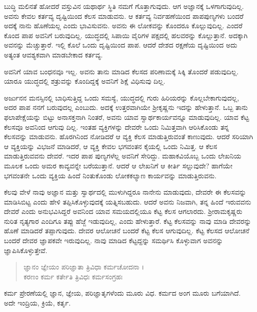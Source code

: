 ಬುದ್ಧಿ ಮಲಿನತೆ ಹೋದರೆ ವಸ್ತುವಿನ ಯಥಾರ್ಥ ಸ್ಥಿತಿ ನಮಗೆ ಗೊತ್ತಾಗುವುದು. ಆಗ ಅಜ್ಞಾನಕ್ಕೆ ಒಳಗಾಗುವುದಿಲ್ಲ. ಅವನು ಕೇವಲ ಕರ್ತವ್ಯ ದೃಷ್ಟಿಯಿಂದ ಕೆಲಸ ಮಾಡುವನು. ಆ ಕರ್ತವ್ಯ ನಿರ್ವಹಣೆಯಿಂದ ಪಾಪಪುಣ್ಯಗಳು ಬಂದರೆ ಅದಕ್ಕೆ ನಾನು ಹೊಣೆಯಲ್ಲ ಎಂದು ಭಾವಿಸುವನು. ಅವನು ಈ ಲೋಕವನ್ನು ಕೊಂದರೂ ಕೊಲ್ಲುವುದಿಲ್ಲ. ಎಂದರೆ ಕೊಂದ ಪಾಪ ಅವನಿಗೆ ಬರುವುದಿಲ್ಲ. ಯುದ್ಧದಲ್ಲಿ ಸಿಪಾಯಿ ವೈರಿಗಳ ಪಕ್ಷದಲ್ಲಿ ಹಲವರನ್ನು ಕೊಲ್ಲುತ್ತಾನೆ. ಅದಕ್ಕಾಗಿ ಅವನನ್ನು ಮೆಚ್ಚುತ್ತಾರೆ. ಇಲ್ಲಿ ಕೊಲೆ ಒಂದು ದೃಷ್ಟಿಯಿಂದ ಪಾಪ. ಆದರೆ ದೇಶದ ರಕ್ಷಣೆಯ ದೃಷ್ಟಿಯಿಂದ ಅದು ಅತ್ಯಂತ ಆವಶ್ಯಕವಾಗಿ ಮಾಡಬೇಕಾದ ಕರ್ತವ್ಯ.

ಅವನಿಗೆ ಯಾವ ಬಂಧನವೂ ಇಲ್ಲ. ಅವನು ತಾನು ಮಾಡಿದ ಕೆಲಸದ ಪರಿಣಾಮಕ್ಕೆ ಸಿಕ್ಕಿ ತೊಂದರೆ ಪಡುವುದಿಲ್ಲ. ಯಾರೂ ಯುದ್ಧದಲ್ಲಿ ಶತ್ರುವನ್ನು ಕೊಂದಿದ್ದಕ್ಕೆ ಅವನಿಗೆ ಶಿಕ್ಷೆ ವಿಧಿಸುವು ದಿಲ್ಲ.

ಅರ್ಜುನನ ಮನಸ್ಸಿನಲ್ಲಿ ಬಾಧಿಸುತ್ತಿದ್ದ ಒಂದು ಸಮಸ್ಯೆ, ಯುದ್ಧದಲ್ಲಿ ಗುರು ಹಿರಿಯರನ್ನು ಕೊಲ್ಲಬೇಕಾಗುವುದಲ್ಲ, ಅದರ ಪಾಪ ನನಗೆ ಬರುವುದಲ್ಲ ಎಂಬುದು. ಅದಕ್ಕೆ ಉತ್ತರವಾಗಿಯೇ ಶ್ರೀಕೃಷ್ಣನು ಇದನ್ನು ಹೇಳುತ್ತಾನೆ. ಒಬ್ಬ ತಾನು ಫಲಾಪೇಕ್ಷೆಯನ್ನು ಬಿಟ್ಟು ಅನಾಸಕ್ತನಾಗಿ ನಿಂತರೆ, ಅವನು ಯಾವ ಸ್ವಾರ್ಥಕಾರ್ಯವನ್ನೂ ಮಾಡುವುದಿಲ್ಲ. ಯಾವ ಕೆಟ್ಟ ಕೆಲಸವೂ ಅವನಿಂದ ಆಗುವು ದಿಲ್ಲ. ಇಂತಹ ವ್ಯಕ್ತಿಗಳನ್ನು ದೇವರೇ ಒಂದು ನಿಮಿತ್ತವಾಗಿ ಆರಿಸಿಕೊಂಡು ತನ್ನ ಕೆಲಸವನ್ನು ಮಾಡುವನು. ಹೊರಗಿನಿಂದ ನೋಡಿದರೆ ಆ ವ್ಯಕ್ತಿ ಕೆಲಸ ಮಾಡುತ್ತಿರುವಂತೆ ಕಾಣುವುದು. ಆದರೆ ಸರಿಯಾಗಿ ಆ ವ್ಯಕ್ತಿಯನ್ನು ವಿಭಜನೆ ಮಾಡಿದರೆ, ಆ ವ್ಯಕ್ತಿ ಕೇವಲ ಭಗವಂತನ ಕೈಯಲ್ಲಿ ಒಂದು ನಿಮಿತ್ತ. ಆ ಕೆಲಸ ಮಾಡುತ್ತಿರುವವನು ದೇವರೆ. ಇದರ ಪಾಪ ಪುಣ್ಯಗಳೆಲ್ಲ ಅವನಿಗೆ ಸೇರಿದ್ದು. ಮಹಾಕವಿಯೊಬ್ಬ ಒಂದು ಲೇಖನಿಯ ಮೂಲಕ ಒಂದು ಅಮರ ಕಾವ್ಯವನ್ನೇ ಬರೆಯುತ್ತಾನೆ. ಆದರೆ ಆ ಲೇಖನಿಗೆ ಆ ಕೀರ್ತಿ ಸಲ್ಲುವುದೇ? ಹಾಗೆಯೇ ಭಗವಂತನೇ ಒಂದು ವ್ಯಕ್ತಿಯ ಹಿಂದೆ ನಿಂತುಕೊಂಡು ಲೋಕಕಲ್ಯಾಣ ಕಾರ್ಯವನ್ನು ಮಾಡುತ್ತಿರುವನು.\eng{}

ಕೆಲವು ವೇಳೆ ನಾವು ಅಜ್ಞಾನ ಮತ್ತು ಸ್ವಾರ್ಥದಲ್ಲಿ ಮುಳುಗಿದ್ದರೂ ನಾನೇನು ಮಾಡುವುದು, ದೇವರೇ ಈ ಕೆಲಸವನ್ನು ಮಾಡಿಸಿಬಿಟ್ಟ ಎಂದು ಹೇಳಿ ತಪ್ಪಿಸಿಕೊಳ್ಳುವುದಕ್ಕೆ ಯತ್ನಿಸಬಹುದು. ಆದರೆ ಅವನು ನಿಜವಾಗಿ, ತನ್ನ ಹಿಂದೆ ಇರುವವನು ದೇವರೆ ಎಂದು ಅನುಭವಿಸಿದ್ದರೆ ಅವನಿಂದ ಯಾವ ಸಮಯದಲ್ಲಿಯೂ ಕೆಟ್ಟ ಕೆಲಸ ಆಗಲಾರದು. ಶ್ರೀರಾಮಕೃಷ್ಣರು ನುರಿತ ನೃತ್ಯಗಾರ ಎಂದಿಗೂ ತಪ್ಪು ಹೆಜ್ಜೆ ಇಡುವುದಿಲ್ಲ, ಎಂದು ಹೇಳುತ್ತಾರೆ. ಕೆಟ್ಟ ಕೆಲಸವನ್ನು ನಾವು ಮಾಡಿ ದೇವರನ್ನು ಹೊಣೆ ಮಾಡಿದರೆ ತಪ್ಪಾಗುವುದು. ದೇವರ ಆಲೋಚನೆ ಬಂದರೆ ಕೆಟ್ಟ ಕೆಲಸ ಆಗುವುದಿಲ್ಲ. ಕೆಟ್ಟ ಕೆಲಸದ ಆಲೋಚನೆ ಬಂದರೆ ದೇವರ ಜ್ಞಾಪಕವೇ ಇರುವುದಿಲ್ಲ. ನಾವು ಮಾಡಿದ ಕೆಟ್ಟದ್ದನ್ನು ಸಮರ್ಥಿಸಿ ಕೊಳ್ಳುವಾಗ ಅವನನ್ನು ಜ್ಞಾಪಿಸಿಕೊಳ್ಳುತ್ತೇವೆ.

\begin{verse}
ಜ್ಞಾನಂ ಜ್ಞೇಯಂ ಪರಿಜ್ಞಾತಾ ತ್ರಿವಿಧಾ ಕರ್ಮಚೋದನಾ । \\ಕರಣಂ ಕರ್ಮ ಕರ್ತೇತಿ ತ್ರಿವಿಧಃ ಕರ್ಮಸಂಗ್ರಹಃ 
\end{verse}

{\small ಕರ್ಮ ಪ್ರೇರಣೆಯಲ್ಲಿ ಜ್ಞಾನ, ಜ್ಞೇಯ, ಪರಿಜ್ಞಾತೃಗಳೆಂದು ಮೂರು ವಿಧ. ಕರ್ಮದ ಅಂಗ ಮೂರು ಬಗೆಯಾಗಿದೆ. ಅದೇ ಇಂದ್ರಿಯ, ಕ್ರಿಯೆ, ಕರ್ತೃ.}

